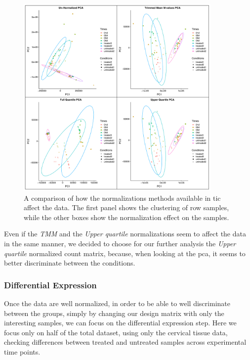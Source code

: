 \begin{figure}[H]
\centering
\includegraphics[width=10cm, keepaspectratio]{img/ticorser/normalizing/pca/all_pca.pdf}
\caption[ticorser normalizing \gls{pca}]{A comparison of how the normalizations methods available in \gls{tic} affect the data.
The first panel shows the clustering of row samples, while the other boxes show the normalization effect on the samples.}
\label{fig:ticorsernormalizingpca}
\end{figure}

Even if the \textit{TMM} and the \textit{Upper quartile} normalizations seem to affect the data in the same manner, we decided to choose for our further analysis the \textit{Upper quartile} normalized count matrix, because, when looking at the \gls{pca}, it seems to better discriminate between the conditions.

\subsubsection{Differential Expression}
Once the data are well normalized, in order to be able to well discriminate between the groups, simply by changing our design matrix with only the interesting samples, we can focus on the differential expression step.
Here we focus only on half of the total dataset, using only the cervical tissue data, checking differences between treated and untreated samples across experimental time points.

